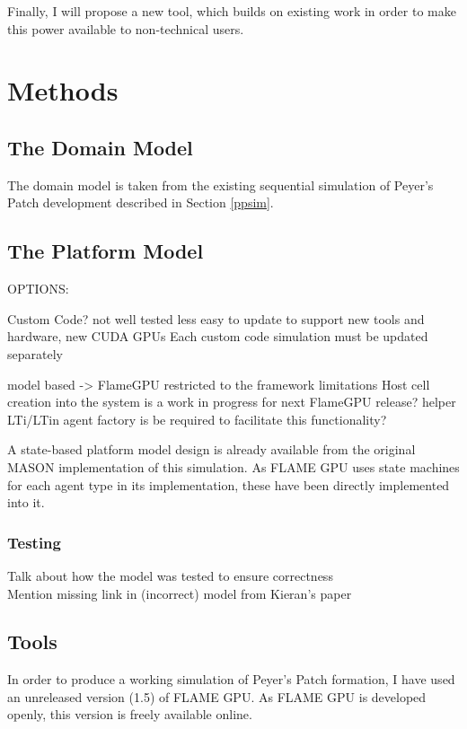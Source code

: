 \documentclass{UoYCSproject}
\begin{document}
Finally, I will propose a new tool, which builds on existing work in order to make this power available to non-technical users.

\chapter{Methods}
\label{methods}
\section{The Domain Model}
The domain model is taken from the existing sequential simulation of Peyer's Patch development described in Section \ref{ppsim}.

\section{The Platform Model}
OPTIONS:

Custom Code?\cite{phil_diss}
	not well tested
	less easy to update to support new tools and hardware, new CUDA GPUs
		Each custom code simulation must be updated separately


model based -> FlameGPU\cite{flame_keratinocyte}
	restricted to the framework limitations
		Host cell creation into the system is a work in progress for next FlameGPU release?
			helper LTi/LTin agent factory is be required to facilitate this functionality?


	A state-based platform model design is already available from the original MASON implementation of this simulation.
	As FLAME GPU uses state machines for each agent type in its implementation, these have been directly implemented into it.

\subsection{Testing}
Talk about how the model was tested to ensure correctness\\
Mention missing link in (incorrect) model from Kieran's paper 

\section{Tools}
In order to produce a working simulation of Peyer's Patch formation, I have used an unreleased version (1.5) of FLAME GPU.
As FLAME GPU is developed openly, this version is freely available online\cite{flame_github}.
\end{document}
